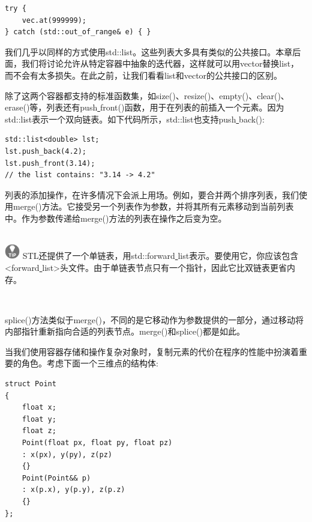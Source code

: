 \begin{lstlisting}[caption={}]
try {
	vec.at(999999);
} catch (std::out_of_range& e) { }
\end{lstlisting}

我们几乎以同样的方式使用std::list。这些列表大多具有类似的公共接口。本章后面，我们将讨论允许从特定容器中抽象的迭代器，这样就可以用vector替换list，而不会有太多损失。在此之前，让我们看看list和vector的公共接口的区别。 \par
除了这两个容器都支持的标准函数集，如size()、resize()、empty()、clear()、erase()等，列表还有push\underline{ }front()函数，用于在列表的前插入一个元素。因为std::list表示一个双向链表。如下代码所示，std::list也支持push\underline{ }back(): \par

\begin{lstlisting}[caption={}]
std::list<double> lst;
lst.push_back(4.2);
lst.push_front(3.14);
// the list contains: "3.14 -> 4.2"
\end{lstlisting}

列表的添加操作，在许多情况下会派上用场。例如，要合并两个排序列表，我们使用merge()方法。它接受另一个列表作为参数，并将其所有元素移动到当前列表中。作为参数传递给merge()方法的列表在操作之后变为空。 \par

\hspace*{\fill} \\ %
\includegraphics[width=0.05\textwidth]{images/tip}
STL还提供了一个单链表，用std::forward\underline{ }list表示。要使用它，你应该包含<forward\underline{ }list>头文件。由于单链表节点只有一个指针，因此它比双链表更省内存。 \par
\noindent\textbf{}\ \par

splice()方法类似于merge()，不同的是它移动作为参数提供的一部分，通过移动将内部指针重新指向合适的列表节点。merge()和splice()都是如此。 \par
当我们使用容器存储和操作复杂对象时，复制元素的代价在程序的性能中扮演着重要的角色。考虑下面一个三维点的结构体: \par

\begin{lstlisting}[caption={}]
struct Point
{
	float x;
	float y;
	float z;
	Point(float px, float py, float pz)
	: x(px), y(py), z(pz)
	{}
	Point(Point&& p)
	: x(p.x), y(p.y), z(p.z)
	{}
};
\end{lstlisting}

